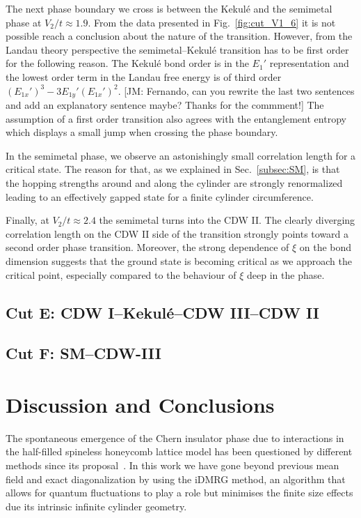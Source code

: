 \documentclass[aps,prx,10pt,twocolumn,floatfix,superscriptaddress,showpacs,numerical,footinbib]{revtex4-1}
\newcommand{\noteJM}[1]{{\color{red} [JM: #1]}}
\begin{document}
The next phase boundary we cross is between the Kekul\'e and the semimetal phase at $V_2/t \approx 1.9$.
%
From the data presented in Fig.~\ref{fig:cut_V1_6} it is not possible reach a conclusion about the nature of the transition.
%
However, from the Landau theory perspective the semimetal--Kekul\'e transition has to be first order for the following reason.
%
The Kekul\'e bond order is in the $E_1'$ representation and the lowest order term in the Landau free energy is of third order $(E_{1x}')^3-3E_{1y}'(E_{1x}')^2$.
\noteJM{Fernando, can you rewrite the last two sentences and add an explanatory sentence maybe? Thanks for the commment!}
%
The assumption of a first order transition also agrees with the entanglement entropy which displays a small jump when crossing the phase boundary.
%

In the semimetal phase, we observe an astonishingly small correlation length for a critical state.
%
The reason for that, as we explained in Sec.~\ref{subsec:SM}, is that the hopping strengths around and along the cylinder are strongly renormalized leading to an effectively gapped state for a finite cylinder circumference.
%

Finally, at $V_2/t \approx 2.4$ the semimetal turns into the CDW II.
%
The clearly diverging correlation length on the CDW II side of the transition strongly points toward a second order phase transition.
%
Moreover, the strong dependence of $\xi$ on the bond dimension suggests that the ground state is becoming critical as we approach the critical point, especially compared to the behaviour of $\xi$ deep in the phase.


\subsection{Cut E: CDW I--Kekul\'e--CDW III--CDW II}

\subsection{Cut F: SM--CDW-III}


% 




%
\section{\label{sec:discconc}Discussion and Conclusions}
%

The spontaneous emergence of the Chern insulator phase due to interactions in the half-filled spineless honeycomb lattice
model has been questioned by different methods since its proposal~\cite{RQHZ08,WF10,GCC13,GGNVC13,DH14,DCH14}.
%
In this work we have gone beyond previous mean field and exact diagonalization by using the iDMRG method, an algorithm that allows for quantum fluctuations
to play a role but minimises the finite size effects due its intrinsic infinite cylinder geometry.
\end{document}
